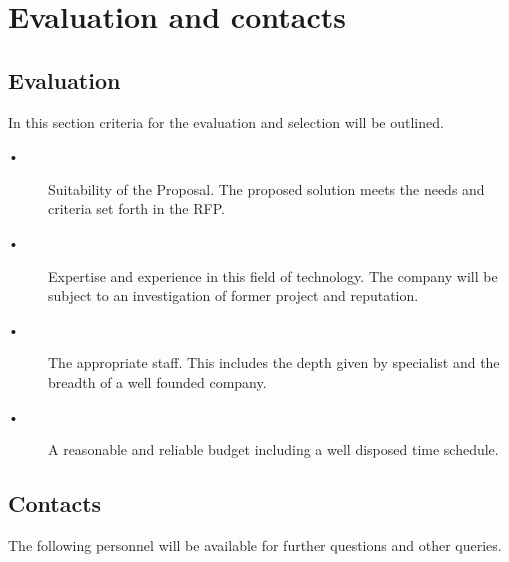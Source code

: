 \chapter{Evaluation and contacts}
\section{Evaluation}
In this section criteria for the evaluation and selection will be outlined. 

\begin{description}
\item[•] Suitability of the Proposal. The proposed solution meets the needs and criteria set forth in the RFP. 

\item[•] Expertise and experience in this field of technology. The company will be subject to an investigation of former project and reputation. 

\item[•] The appropriate staff. This includes the depth given by specialist and the breadth of a well founded company. 

\item[•] A reasonable and reliable budget including a well disposed time schedule. 

\end{description}

\section{Contacts}
The following personnel will be available for further questions and other queries.

 \\
 \\
